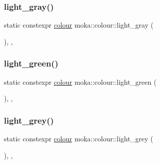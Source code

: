 \mbox{\label{classmoka_1_1colour_a7ca64849f564ebb7f3b57d48c5559607}} 
\subsubsection{\texorpdfstring{light\_gray()}{light\_gray()}}
{\footnotesize\ttfamily static constexpr \mbox{\hyperlink{classmoka_1_1colour}{colour}} moka\+::colour\+::light\+\_\+gray (\begin{DoxyParamCaption}{ }\end{DoxyParamCaption})\hspace{0.3cm}{\ttfamily [inline]}, {\ttfamily [static]}, {\ttfamily [noexcept]}}

\mbox{\label{classmoka_1_1colour_af776482fd76aeb8ab41587fd1ff11912}} 
\subsubsection{\texorpdfstring{light\_green()}{light\_green()}}
{\footnotesize\ttfamily static constexpr \mbox{\hyperlink{classmoka_1_1colour}{colour}} moka\+::colour\+::light\+\_\+green (\begin{DoxyParamCaption}{ }\end{DoxyParamCaption})\hspace{0.3cm}{\ttfamily [inline]}, {\ttfamily [static]}, {\ttfamily [noexcept]}}

\mbox{\label{classmoka_1_1colour_a0b1fc6cd85e9d91c145fc43eac785b7c}} 
\subsubsection{\texorpdfstring{light\_grey()}{light\_grey()}}
{\footnotesize\ttfamily static constexpr \mbox{\hyperlink{classmoka_1_1colour}{colour}} moka\+::colour\+::light\+\_\+grey (\begin{DoxyParamCaption}{ }\end{DoxyParamCaption})\hspace{0.3cm}{\ttfamily [inline]}, {\ttfamily [static]}, {\ttfamily [noexcept]}}

